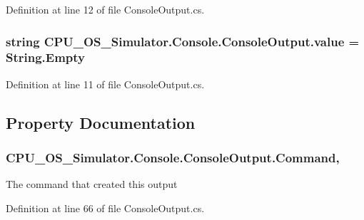 Definition at line 12 of file Console\+Output.\+cs.

\hypertarget{class_c_p_u___o_s___simulator_1_1_console_1_1_console_output_a3bc577f947d51bc1b5c3880d5a7d5158}{}
\subsubsection[{value}]{\setlength{\rightskip}{0pt plus 5cm}string C\+P\+U\+\_\+\+O\+S\+\_\+\+Simulator.\+Console.\+Console\+Output.\+value = String.\+Empty\hspace{0.3cm}{\ttfamily [private]}}\label{class_c_p_u___o_s___simulator_1_1_console_1_1_console_output_a3bc577f947d51bc1b5c3880d5a7d5158}


Definition at line 11 of file Console\+Output.\+cs.



\subsection{Property Documentation}
\hypertarget{class_c_p_u___o_s___simulator_1_1_console_1_1_console_output_a15b8bc11762105b9b984135cf892a0b5}{}
\subsubsection[{Command}]{ C\+P\+U\+\_\+\+O\+S\+\_\+\+Simulator.\+Console.\+Console\+Output.\+Command\hspace{0.3cm}{\ttfamily [get]}, {\ttfamily [set]}}\label{class_c_p_u___o_s___simulator_1_1_console_1_1_console_output_a15b8bc11762105b9b984135cf892a0b5}


The command that created this output 



Definition at line 66 of file Console\+Output.\+cs.

